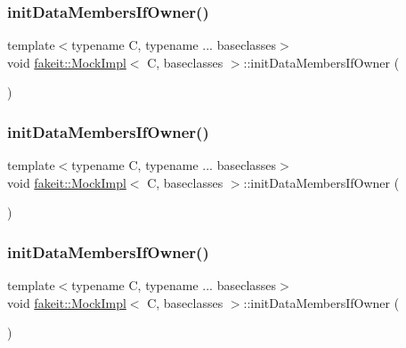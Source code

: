 \subsubsection{\texorpdfstring{initDataMembersIfOwner()}{initDataMembersIfOwner()}\hspace{0.1cm}{\footnotesize\ttfamily [4/9]}}
{\footnotesize\ttfamily template$<$typename C, typename ... baseclasses$>$ \\
void \mbox{\hyperlink{classfakeit_1_1MockImpl}{fakeit\+::\+Mock\+Impl}}$<$ C, baseclasses $>$\+::init\+Data\+Members\+If\+Owner (\begin{DoxyParamCaption}{ }\end{DoxyParamCaption})\hspace{0.3cm}{\ttfamily [inline]}}

\mbox{\label{classfakeit_1_1MockImpl_ad403c33f4734e31196ead952fc4c4805}} 
\subsubsection{\texorpdfstring{initDataMembersIfOwner()}{initDataMembersIfOwner()}\hspace{0.1cm}{\footnotesize\ttfamily [5/9]}}
{\footnotesize\ttfamily template$<$typename C, typename ... baseclasses$>$ \\
void \mbox{\hyperlink{classfakeit_1_1MockImpl}{fakeit\+::\+Mock\+Impl}}$<$ C, baseclasses $>$\+::init\+Data\+Members\+If\+Owner (\begin{DoxyParamCaption}{ }\end{DoxyParamCaption})\hspace{0.3cm}{\ttfamily [inline]}}

\mbox{\label{classfakeit_1_1MockImpl_ad403c33f4734e31196ead952fc4c4805}} 
\subsubsection{\texorpdfstring{initDataMembersIfOwner()}{initDataMembersIfOwner()}\hspace{0.1cm}{\footnotesize\ttfamily [6/9]}}
{\footnotesize\ttfamily template$<$typename C, typename ... baseclasses$>$ \\
void \mbox{\hyperlink{classfakeit_1_1MockImpl}{fakeit\+::\+Mock\+Impl}}$<$ C, baseclasses $>$\+::init\+Data\+Members\+If\+Owner (\begin{DoxyParamCaption}{ }\end{DoxyParamCaption})\hspace{0.3cm}{\ttfamily [inline]}}


